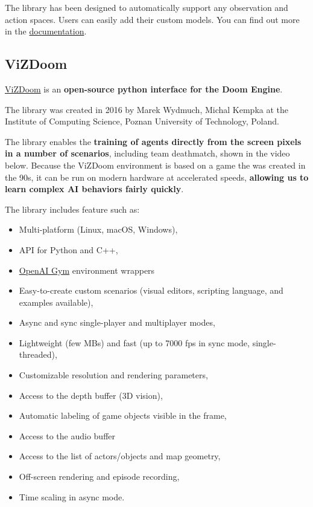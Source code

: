 \documentclass[11pt,a4paper]{article}
\begin{document}
The library has been designed to automatically support any observation and action spaces. Users can easily add their custom models. You can find out more in the \href{https://www.samplefactory.dev/03-customization/custom-models/\#actor-critic-models-in-sample-factory}{documentation}.

\subsection{ViZDoom}\label{vizdoom}

\href{https://vizdoom.cs.put.edu.pl/}{ViZDoom} is an \textbf{open-source python interface for the Doom Engine}.

The library was created in 2016 by Marek Wydmuch, Michal Kempka at the Institute of Computing Science, Poznan University of Technology, Poland.

The library enables the \textbf{training of agents directly from the screen pixels in a number of scenarios}, including team deathmatch, shown in the video below. Because the ViZDoom environment is based on a game the was created in the 90s, it can be run on modern hardware at accelerated speeds, \textbf{allowing us to learn complex AI behaviors fairly quickly}.

The library includes feature such as:

\begin{itemize}
\tightlist
\item
  Multi-platform (Linux, macOS, Windows),
\item
  API for Python and C++,
\item
  \href{https://www.gymlibrary.dev/}{OpenAI Gym} environment wrappers
\item
  Easy-to-create custom scenarios (visual editors, scripting language, and examples available),
\item
  Async and sync single-player and multiplayer modes,
\item
  Lightweight (few MBs) and fast (up to 7000 fps in sync mode, single-threaded),
\item
  Customizable resolution and rendering parameters,
\item
  Access to the depth buffer (3D vision),
\item
  Automatic labeling of game objects visible in the frame,
\item
  Access to the audio buffer
\item
  Access to the list of actors/objects and map geometry,
\item
  Off-screen rendering and episode recording,
\item
  Time scaling in async mode.
\end{itemize}
\end{document}
